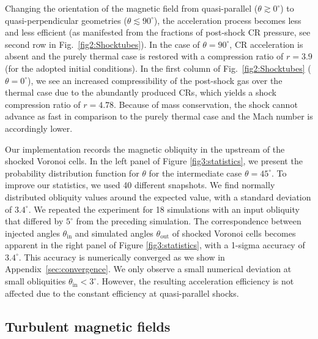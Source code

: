 \documentclass[8pt,a4paper,usenatbib]{mnras}
\begin{document}
Changing the orientation of the magnetic field from quasi-parallel
($\theta\gtrsim0^\circ$) to quasi-perpendicular geometries
($\theta\lesssim90^\circ$), the acceleration process becomes less and less
efficient (as manifested from the fractions of post-shock CR pressure, see
second row in Fig.~\ref{fig2:Shocktubes}). In the case of $\theta = 90^\circ$,
CR acceleration is absent and the purely thermal case is restored with a
compression ratio of $r = 3.9$ (for the adopted initial conditions).  In the
first column of Fig.~\ref{fig2:Shocktubes} ($\theta = 0^\circ$), we see an
increased compressibility of the post-shock gas over the thermal case due to the
abundantly produced CRs, which yields a shock compression ratio of
$r=4.78$. Because of mass conservation, the shock cannot advance as fast in
comparison to the purely thermal case and the Mach number is accordingly lower.

Our implementation records the magnetic obliquity in the upstream of the shocked
Voronoi cells.  In the left panel of Figure \ref{fig3:statistics}, we present
the probability distribution function for $\theta$ for the intermediate case
$\theta = 45^\circ$.  To improve our statistics, we used 40 different
snapshots. We find normally distributed obliquity values around the expected
value, with a standard deviation of $3.4^\circ$. We repeated the experiment for 18
simulations with an input obliquity that differed by $5^\circ$ from the
preceding simulation.  The correspondence between injected angles
$\theta_\mathrm{in}$ and simulated angles $\theta_{\mathrm{out}}$ of shocked
Voronoi cells becomes apparent in the right panel of Figure
\ref{fig3:statistics}, with a 1-sigma accuracy of $3.4^\circ$. This accuracy is
numerically converged as we show in Appendix~\ref{sec:convergence}.  We only
observe a small numerical deviation at small obliquities
$\theta_\mathrm{in}<3^\circ$.  However, the resulting acceleration efficiency is
not affected due to the constant efficiency at quasi-parallel shocks.


\subsection{Turbulent magnetic fields}
\label{sec:turb_ICs}
\end{document}
